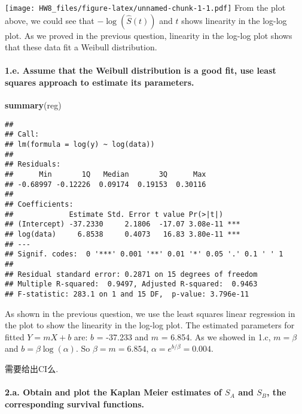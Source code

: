 \documentclass[]{article}
\newenvironment{Shaded}{\begin{snugshade}}{\end{snugshade}}
\newcommand{\KeywordTok}[1]{\textcolor[rgb]{0.13,0.29,0.53}{\textbf{#1}}}
\newcommand{\NormalTok}[1]{#1}
\let\oldparagraph\paragraph
\renewcommand{\paragraph}[1]{\oldparagraph{#1}\mbox{}}
\begin{document}
\texttt{[image: HW8\_files/figure-latex/unnamed-chunk-1-1.pdf]} From the
plot above, we could see that \(-\log(\hat{S}(t))\) and \(t\) shows
linearity in the log-log plot. As we proved in the previous question,
linearity in the log-log plot shows that these data fit a Weibull
distribution.

\hypertarget{e.-assume-that-the-weibull-distribution-is-a-good-fit-use-least-squares-approach-to-estimate-its-parameters.}{%
\paragraph{1.e. Assume that the Weibull distribution is a good fit, use
least squares approach to estimate its
parameters.}\label{e.-assume-that-the-weibull-distribution-is-a-good-fit-use-least-squares-approach-to-estimate-its-parameters.}}

\begin{Shaded}
\begin{Highlighting}[]
\KeywordTok{summary}\NormalTok{(reg)}
\end{Highlighting}
\end{Shaded}

\begin{verbatim}
## 
## Call:
## lm(formula = log(y) ~ log(data))
## 
## Residuals:
##      Min       1Q   Median       3Q      Max 
## -0.68997 -0.12226  0.09174  0.19153  0.30116 
## 
## Coefficients:
##             Estimate Std. Error t value Pr(>|t|)    
## (Intercept) -37.2330     2.1806  -17.07 3.08e-11 ***
## log(data)     6.8538     0.4073   16.83 3.80e-11 ***
## ---
## Signif. codes:  0 '***' 0.001 '**' 0.01 '*' 0.05 '.' 0.1 ' ' 1
## 
## Residual standard error: 0.2871 on 15 degrees of freedom
## Multiple R-squared:  0.9497, Adjusted R-squared:  0.9463 
## F-statistic: 283.1 on 1 and 15 DF,  p-value: 3.796e-11
\end{verbatim}

As shown in the previous question, we use the least squares linear
regression in the plot to show the linearity in the log-log plot. The
estimated parameters for fitted \(Y=mX+b\) are: \(b\) = -37.233 and
\(m\) = 6.854. As we showed in 1.c, \(m = \beta\) and
\(b = \beta \log(\alpha)\). So \(\beta = m = 6.854\),
\(\alpha = e^{b/\beta} = 0.004\).

需要给出CI么.

\hypertarget{a.-obtain-and-plot-the-kaplan-meier-estimates-of-s_a-and-s_b-the-corresponding-survival-functions.}{%
\paragraph{\texorpdfstring{2.a. Obtain and plot the Kaplan Meier
estimates of \(S_A\) and \(S_B\), the corresponding survival
functions.}{2.a. Obtain and plot the Kaplan Meier estimates of S\_A and S\_B, the corresponding survival functions.}}\label{a.-obtain-and-plot-the-kaplan-meier-estimates-of-s_a-and-s_b-the-corresponding-survival-functions.}}
\end{document}
